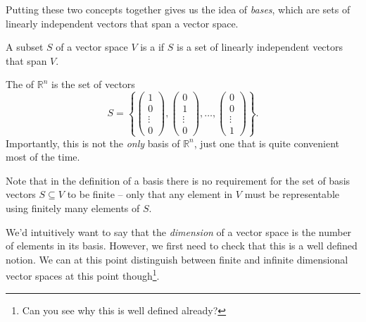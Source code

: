 \documentclass[a4paper]{scrartcl}
\begin{document}


Putting these two concepts together gives us the idea of \emph{bases}, which are sets of linearly independent vectors that span a vector space.

\begin{definition}[Basis]
    A subset $S$ of a vector space $V$ is a  if $S$ is a set of linearly independent vectors that span $V$.
\end{definition}

\begin{example}
    The  of $\mathbb{R}^n$ is the set of vectors
    $$
    S = \left\{
        \begin{pmatrix}1 \\ 0 \\ \vdots \\ 0\end{pmatrix},
        \begin{pmatrix}0 \\ 1 \\ \vdots \\ 0\end{pmatrix},
        \dots,
        \begin{pmatrix}0 \\ 0 \\ \vdots \\ 1\end{pmatrix}
    \right\}.
    $$
    Importantly, this is not the \emph{only} basis of $\mathbb{R}^n$, just one that is quite convenient most of the time.
\end{example}

\begin{remark}
    Note that in the definition of a basis there is no requirement for the set of basis vectors $S \subseteq V$ to be finite -- only that any element in $V$ must be representable using finitely many elements of $S$. 
\end{remark}

We'd intuitively want to say that the \emph{dimension} of a vector space is the number of elements in its basis. However, we first need to check that this is a well defined notion.
We can at this point distinguish between finite and infinite dimensional vector spaces at this point though\footnote{Can you see why this is well defined already?}.
\end{document}
